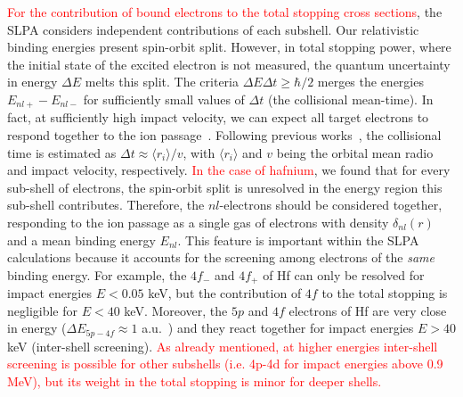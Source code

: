 \documentclass[aps,pra,reprint,superscriptaddress]{revtex4-1}
\def\clau#1{\textcolor{red}{#1}}
\begin{document}
\clau{For the contribution of bound electrons to the total stopping cross sections}, the SLPA considers independent contributions of each subshell. Our relativistic binding energies present spin-orbit split. However, in total stopping power, where the initial state of the excited electron is not measured, the quantum uncertainty in energy $\Delta E$ melts this split. The criteria $\Delta E\Delta t\geq\hbar/2$ merges the energies 
$E_{nl+}-E_{nl-}$ for sufficiently small values of $\Delta t$ (the 
collisional mean-time). In fact, at sufficiently high impact velocity, 
we can expect all target electrons to respond together to the ion 
passage~\cite{lindhard53,chu72}. Following previous works~\cite{mon09},
the collisional time is estimated as $\Delta t\approx\langle r_i\rangle/v$, 
with $\langle r_i\rangle$ and $v$ being the orbital mean radio and 
impact velocity, respectively. 
\clau{In the case of hafnium}, we found that for every sub-shell of electrons, the spin-orbit split is unresolved in the energy region this sub-shell contributes. Therefore, the $nl$-electrons should be 
considered together, responding to the ion passage as a single gas of 
electrons with density $\delta_{nl}(r)$ and a mean binding energy 
$E_{nl}$. This feature is important within the SLPA calculations because 
it accounts for the screening among electrons of the \textit{same} 
binding energy. For example, the $4f_{-}$ and $4f_{+}$ of Hf can only 
be resolved for impact energies $E<0.05$ keV, but the contribution of 
$4f$ to the total stopping is negligible for $E<40$ keV. Moreover, the 
$5p$ and $4f$ electrons of Hf are very close in energy 
($\Delta E_{5p-4f} \approx 1$ a.u.~\cite{mendez2019}) and they react 
together for impact energies $E>40$ keV (inter-shell screening). \clau{As already mentioned, at higher energies inter-shell screening is possible for other subshells (i.e. 4p-4d for impact energies above 0.9 MeV), but its weight in the total stopping is minor for deeper shells.}
\end{document}
